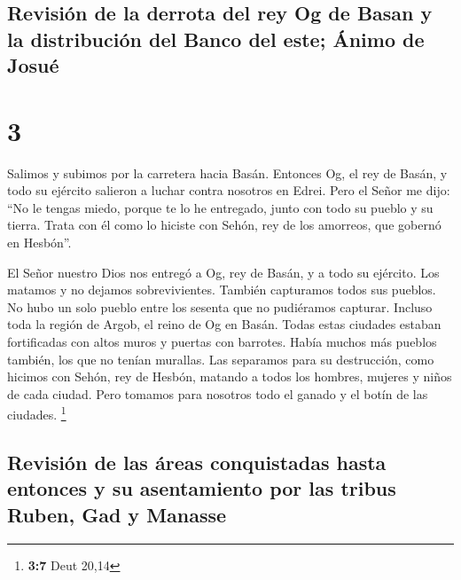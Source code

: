 \hypertarget{revisiuxf3n-de-la-derrota-del-rey-og-de-basan-y-la-distribuciuxf3n-del-banco-del-este-uxe1nimo-de-josuuxe9}{%
\subsection{Revisión de la derrota del rey Og de Basan y la distribución
del Banco del este; Ánimo de
Josué}\label{revisiuxf3n-de-la-derrota-del-rey-og-de-basan-y-la-distribuciuxf3n-del-banco-del-este-uxe1nimo-de-josuuxe9}}

\hypertarget{section-2}{%
\section{3}\label{section-2}}

 Salimos y subimos por la carretera hacia Basán. Entonces
Og, el rey de Basán, y todo su ejército salieron a luchar contra
nosotros en Edrei.  Pero el Señor me dijo: ``No le tengas
miedo, porque te lo he entregado, junto con todo su pueblo y su tierra.
Trata con él como lo hiciste con Sehón, rey de los amorreos, que gobernó
en Hesbón''.

 El Señor nuestro Dios nos entregó a Og, rey de Basán, y a
todo su ejército. Los matamos y no dejamos sobrevivientes.
 También capturamos todos sus pueblos. No hubo un solo
pueblo entre los sesenta que no pudiéramos capturar. Incluso toda la
región de Argob, el reino de Og en Basán.  Todas estas
ciudades estaban fortificadas con altos muros y puertas con barrotes.
Había muchos más pueblos también, los que no tenían murallas.
 Las separamos para su destrucción, como hicimos con
Sehón, rey de Hesbón, matando a todos los hombres, mujeres y niños de
cada ciudad.  Pero tomamos para nosotros todo el ganado y
el botín de las ciudades. \footnote{\textbf{3:7} Deut 20,14}

\hypertarget{revisiuxf3n-de-las-uxe1reas-conquistadas-hasta-entonces-y-su-asentamiento-por-las-tribus-ruben-gad-y-manasse}{%
\subsection{Revisión de las áreas conquistadas hasta entonces y su
asentamiento por las tribus Ruben, Gad y
Manasse}\label{revisiuxf3n-de-las-uxe1reas-conquistadas-hasta-entonces-y-su-asentamiento-por-las-tribus-ruben-gad-y-manasse}}

